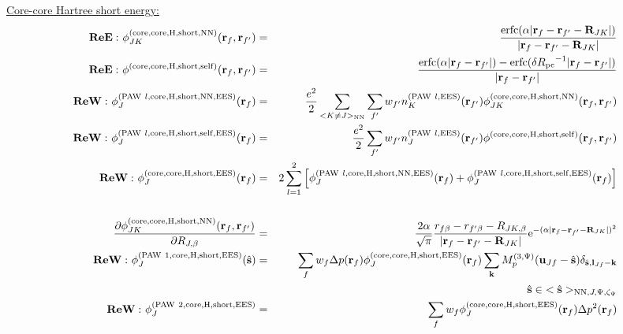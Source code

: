 \documentclass[paper=a4, fontsize=11pt]{article} %
\numberwithin{equation}{section} %
\numberwithin{figure}{section} %
\numberwithin{table}{section} %
\newcommand{\p}{\partial}
\newcommand{\bu}{{\bf{u}}}
\newcommand{\bl}{{\bf{l}}}
\newcommand{\bk}{{\bf{k}}}
\newcommand{\bs}{{\bf{s}}}
\newcommand{\br}{{\bf{r}}}
\newcommand{\bR}{{\bf{R}}}
\newcommand{\hs}{{\hat{\bf{s}}}}
\newcommand{\rEES}{{\mathrm{EES}}}
\newcommand{\rcore}{{\mathrm{core}}}
\newcommand{\rNN}{{\mathrm{NN}}}
\newcommand{\rself}{{\mathrm{self}}}
\newcommand{\re}{{\mathrm{e}}}
\newcommand{\rshort}{{\mathrm{short}}}
\newcommand{\rerfc}{{\mathrm{erfc}}}
\newcommand{\rP}{{\mathrm{PAW}}}
\newcommand{\rH}{{\mathrm{H}}}
\newcommand{\al}{{\alpha}}
\newcommand{\RJb}{{R_{J,\beta}}}
\newcommand{\Rpc}{{R_{\mathrm{pc}}}}
\newcommand{\Mp}{{M_p^{(3,\Psi)}}}
\newcommand{\hsJp}{{<\hs>_{\rNN,J,\Psi,\zeta_\Psi}}}
\newcommand{\hsinJp}{{\ \ \ \ \ \hs  \in  \hsJp}}
\newcommand{\ReE}{{{\bf ReE:\ }}}
\newcommand{\ReW}{{{\bf ReW:\ }}}
\begin{document}
\underline{Core-core Hartree short energy:}
\begin{eqnarray}
\label{ReEphi:ff'corecoreHshortNN}
\ReE \phi_{JK}^{(\rcore,\rcore,\rH,\rshort,\rNN)}(\br_f,\br_{f'}) &=& \frac{\rerfc(\alpha|\br_f-\br_{f'}-\bR_{JK}|)}{|\br_f-\br_{f'}-\bR_{JK}|} \\
\label{ReEphi:ff'corecoreHshortself}
\ReE \phi^{(\rcore,\rcore,\rH,\rshort,\rself)}(\br_f,\br_{f'})&=&\frac{\rerfc(\alpha|\br_f-\br_{f'}|)-\rerfc(\delta \Rpc^{-1}|\br_f-\br_{f'}|)}{|\br_f-\br_{f'}|} \\
\label{ReWphi:fPAWlcoreHshortNN}
\ReW \phi_J^{(\rP\ l,\rcore,\rH,\rshort,\rNN,\rEES)}(\br_f) &=& \frac{e^2}{2}\sum_{<K \neq J>_\rNN}\sum_{f'}w_{f'}n_K^{(\rP\ l,\rEES)}(\br_{f'}) \phi_{JK}^{(\rcore,\rcore,\rH,\rshort,\rNN)}(\br_f,\br_{f'}) \\
\label{ReWphi:fPAWlcoreHshortself}
\ReW \phi_J^{(\rP\ l,\rcore,\rH,\rshort,\rself,\rEES)}(\br_f) & =& \frac{e^2}{2}\sum_{f'} w_{f'} n_J^{(\rP\ l,\rEES)}(\br_{f'})\phi^{(\rcore,\rcore,\rH,\rshort,\rself)}(\br_f,\br_{f'}) \\
\label{phi:fHshortlReW}
\ReW \phi_J^{(\rcore,\rcore,\rH,\rshort,\rEES)}(\br_f) &=& 2\sum_{l=1}^2\left[\phi_J^{(\rP\ l,\rcore,\rH,\rshort,\rNN,\rEES)}(\br_f) + \phi_J^{(\rP\ l,\rcore,\rH,\rshort,\rself,\rEES)}(\br_f) \right] \nonumber\\
\\
\label{dphidR:fHshortNN}
\frac{\p \phi_{JK}^{(\rcore,\rcore,\rH,\rshort,\rNN)}(\br_f,\br_{f'})}{\p \RJb}
&=& \frac{2\al}{\sqrt{\pi}} \frac{r_{f\beta}-r_{f'\beta}-R_{JK,\beta}}{|\br_f-\br_{f'}-\bR_{JK}|}\re^{-(\alpha|\br_f-\br_{f'}-\bR_{JK}|)^2}\\
\label{ReWphi:sPAW1coreHshort}
\ReW \phi_J^{(\rP\ 1,\rcore,\rH,\rshort,\rEES)}(\hs) &=& \sum_f w_f \Delta p(\br_f) \phi_J^{(\rcore,\rcore,\rH,\rshort,\rEES)}(\br_f) \sum_{\bk} \Mp(\bu_{Jf}-\hat \bs)\delta_{\hat \bs,\bl_{Jf}-\bk} \nonumber \\
&\ &\hspace*{2.4in} \hsinJp \\
\label{ReWphi:PAW2coreHshort}
\ReW \phi_J^{(\rP\ 2,\rcore,\rH,\rshort,\rEES)} &=&  \sum_f w_f \phi_J^{(\rcore,\rcore,\rH,\rshort,\rEES)}(\br_f) \Delta p^2(\br_f)
\end{eqnarray}
\end{document}
